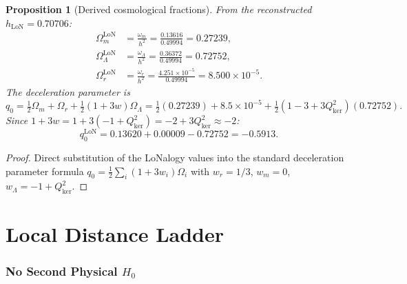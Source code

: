 \documentclass[12pt]{article}
\theoremstyle{plain}
\newtheorem{proposition}[theorem]{Proposition}
\theoremstyle{definition}
\numberwithin{equation}{section}
\newcommand{\kker}{\mathrm{ker}}
\newcommand{\LoN}{\mathrm{LoN}}
\begin{document}
\begin{proposition}[Derived cosmological fractions]\label{prop:fractions}
From the reconstructed $h_{\LoN}=0.70706$:
\begin{align}
\Omega_m^{\LoN} &= \frac{\omega_m}{h^2} = \frac{0.13616}{0.49994} = 0.27239,\\
\Omega_\Lambda^{\LoN} &= \frac{\omega_\Lambda}{h^2} = \frac{0.36372}{0.49994} = 0.72752,\\
\Omega_r^{\LoN} &= \frac{\omega_r}{h^2} = \frac{4.251\times10^{-5}}{0.49994} = 8.500\times10^{-5}.
\end{align}
The deceleration parameter is
\begin{equation}
q_0 = \tfrac{1}{2}\Omega_m + \Omega_r + \tfrac{1}{2}(1+3w)\Omega_\Lambda
= \tfrac{1}{2}(0.27239) + 8.5\times10^{-5} + \tfrac{1}{2}(1-3+3Q_{\kker}^2)(0.72752).
\end{equation}
Since $1+3w=1+3(-1+Q_{\kker}^2)=-2+3Q_{\kker}^2\approx-2$:
\begin{equation}
\boxed{q_0^{\LoN} = 0.13620+0.00009-0.72752 = -0.5913.}
\end{equation}
\end{proposition}

\begin{proof}
Direct substitution of the LoNalogy values into the standard
deceleration parameter formula
$q_0=\frac{1}{2}\sum_i(1+3w_i)\Omega_i$
with $w_r=1/3$, $w_m=0$, $w_\Lambda=-1+Q_{\kker}^2$.
\end{proof}


\part{Local Distance Ladder}

\section{No Second Physical $H_0$}\label{sec:nosecondH0}
\end{document}
